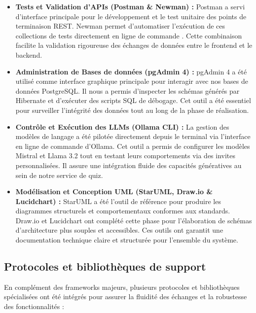 \begin{itemize}
    \item \textbf{Tests et Validation d'APIs (Postman \& Newman) :}
    Postman a servi d'interface principale pour le développement et le test unitaire des points de terminaison REST. Newman permet d'automatiser l'exécution de ces collections de tests directement en ligne de commande \cite{postman_newman_docs}. Cette combinaison facilite la validation rigoureuse des échanges de données entre le frontend et le backend.
    
    \item \textbf{Administration de Bases de données (pgAdmin 4) :}  
    pgAdmin 4 a été utilisé comme interface graphique principale pour interagir avec nos bases de données PostgreSQL. Il nous a permis d'inspecter les schémas générés par Hibernate et d'exécuter des scripts SQL de débogage. Cet outil a été essentiel pour surveiller l'intégrité des données tout au long de la phase de réalisation.
    
    \item \textbf{Contrôle et Exécution des LLMs (Ollama CLI) :}  
    La gestion des modèles de langage a été pilotée directement depuis le terminal via l'interface en ligne de commande d'Ollama. Cet outil a permis de configurer les modèles Mistral et Llama 3.2 tout en testant leurs comportements via des invites personnalisées. Il assure une intégration fluide des capacités génératives au sein de notre service de quiz.
    
    \item \textbf{Modélisation et Conception UML (StarUML, Draw.io \& Lucidchart) :}  
    StarUML a été l'outil de référence pour produire les diagrammes structurels et comportementaux conformes aux standards. Draw.io et Lucidchart ont complété cette phase pour l'élaboration de schémas d'architecture plus souples et accessibles. Ces outils ont garantit une documentation technique claire et structurée pour l'ensemble du système.
\end{itemize}

\subsection{Protocoles et bibliothèques de support}
En complément des frameworks majeurs, plusieurs protocoles et bibliothèques spécialisées ont été intégrés pour assurer la fluidité des échanges et la robustesse des fonctionnalités :

